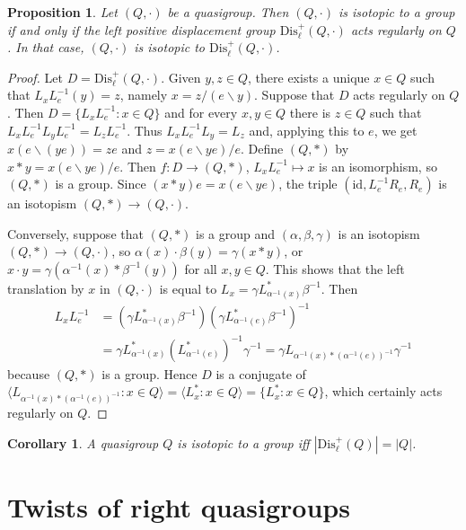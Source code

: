 \documentclass{amsart}
\def\rdiv{/}
\def\ldiv{\backslash}
\theoremstyle{plain}
\newtheorem{corollary}[theorem]{Corollary}
\newtheorem{proposition}[theorem]{Proposition}
\theoremstyle{definition}
\begin{document}
\begin{proposition}
Let $(Q,\cdot)$ be a quasigroup. Then $(Q,\cdot)$ is isotopic to a group if and only if the left positive displacement group $\mathrm{Dis}_\ell^+(Q,\cdot)$ acts regularly on $Q$. In that case, $(Q,\cdot)$ is isotopic to
$\mathrm{Dis}_\ell^+(Q,\cdot)$.
\end{proposition}
\begin{proof}
Let $D=\mathrm{Dis}_\ell^+(Q,\cdot)$. Given $y,z\in Q$, there exists a unique $x\in Q$ such that $L_xL_e^{-1}(y)=z$, namely $x = z\rdiv (e\ldiv y)$. Suppose that $D$ acts regularly on $Q$. Then $D=\{L_xL_e^{-1}:x\in Q\}$ and for every $x,y\in Q$ there is $z\in Q$ such that $L_xL_e^{-1}L_yL_e^{-1} = L_zL_e^{-1}$. Thus $L_xL_e^{-1}L_y = L_z$ and, applying this to $e$, we get $x(e\ldiv (ye)) = ze$ and $z=x(e\ldiv ye)\rdiv e$. Define $(Q,*)$ by $x*y = x(e\ldiv ye)\rdiv e$. Then $f:D\to (Q,*)$, $L_xL_e^{-1}\mapsto x$ is an isomorphism, so $(Q,*)$ is a group. Since $(x*y)e = x(e\ldiv ye)$, the triple $(\mathrm{id},L_e^{-1}R_e,R_e)$ is an isotopism $(Q,*)\to (Q,\cdot)$.

Conversely, suppose that $(Q,*)$ is a group and $(\alpha,\beta,\gamma)$ is an isotopism $(Q,*)\to (Q,\cdot)$, so $\alpha(x)\cdot\beta(y) = \gamma(x*y)$, or $x\cdot y = \gamma(\alpha^{-1}(x)*\beta^{-1}(y))$ for all $x,y\in Q$. This shows that the left translation by $x$ in $(Q,\cdot)$ is equal to $L_x = \gamma L_{\alpha^{-1}(x)}^*\beta^{-1}$. Then
\begin{align*}
    L_xL_e^{-1} &= (\gamma L_{\alpha^{-1}(x)}^*\beta^{-1})(\gamma L_{\alpha^{-1}(e)}^*\beta^{-1})^{-1}\\
     &= \gamma L_{\alpha^{-1}(x)}^*(L_{\alpha^{-1}(e)}^*)^{-1}\gamma^{-1} = \gamma L_{\alpha^{-1}(x)*(\alpha^{-1}(e))^{-1}}\gamma^{-1}
\end{align*}
because $(Q,*)$ is a group. Hence $D$ is a conjugate of $\langle L_{\alpha^{-1}(x)*(\alpha^{-1}(e))^{-1}}:x\in Q\rangle = \langle L_x^*:x\in Q\rangle = \{L_x^*:x\in Q\}$, which certainly acts regularly on $Q$.
\end{proof}

\begin{corollary}
A quasigroup $Q$ is isotopic to a group iff $|\mathrm{Dis}_\ell^+(Q)|=|Q|$.
\end{corollary}

\section{Twists of right quasigroups}
\end{document}
